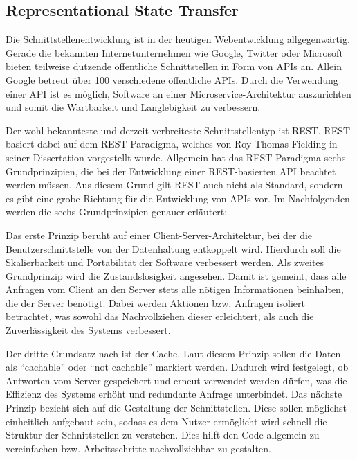 \subsection{Representational State Transfer}

Die Schnittstellenentwicklung ist in der heutigen Webentwicklung allgegenwärtig.
Gerade die bekannten Internetunternehmen wie Google\autocite{MS-GoogleLLC.2020}, Twitter\autocite{MS-TwitterInc..01.03.2020} oder Microsoft\autocite{MS-MicrosoftCorporation.21.05.2018} bieten teilweise dutzende öffentliche Schnittstellen in Form von \acp{API} an.
Allein Google betreut über 100 verschiedene öffentliche \acp{API}\autocite{rf-google-api-alle}.
Durch die Verwendung einer \ac{API} ist es möglich, Software an einer Microservice-Architektur auszurichten und somit die Wartbarkeit und Langlebigkeit zu verbessern.\autocite{rf-fowler2015microservices}

Der wohl bekannteste und derzeit verbreiteste Schnittstellentyp ist \ac{REST}.
\ac{REST} basiert dabei auf dem \ac{REST}-Paradigma, welches von Roy Thomas Fielding in seiner Dissertation\autocite{MS-Fielding.} vorgestellt wurde. Allgemein hat das \ac{REST}-Paradigma sechs Grundprinzipien, die bei der Entwicklung einer \ac{REST}-basierten \ac{API} beachtet werden müssen. 
Aus diesem Grund gilt \ac{REST} auch nicht als Standard, sondern es gibt eine grobe Richtung für die Entwicklung von \acp{API} vor.
Im Nachfolgenden werden die sechs Grundprinzipien genauer erläutert:

Das erste Prinzip beruht auf einer Client-Server-Architektur, bei der die Benutzerschnittstelle von der Datenhaltung entkoppelt wird. %
Hierdurch soll die Skalierbarkeit und Portabilität der Software verbessert werden.
Als zweites Grundprinzip wird die Zustandslosigkeit angesehen.
Damit ist gemeint, dass alle Anfragen vom Client an den Server stets alle nötigen Informationen beinhalten, die der Server benötigt.
Dabei werden Aktionen bzw. Anfragen isoliert betrachtet, was sowohl das Nachvollziehen dieser erleichtert, als auch die Zuverlässigkeit des Systems verbessert.

Der dritte Grundsatz nach \citeauthor{MS-Fielding.} ist der Cache. 
Laut diesem Prinzip sollen die Daten als \enquote{cachable} oder \enquote{not cachable} markiert werden.
Dadurch wird festgelegt, ob Antworten vom Server gespeichert und erneut verwendet werden dürfen, was die Effizienz des Systems erhöht und redundante Anfrage unterbindet.
Das nächste Prinzip bezieht sich auf die Gestaltung der Schnittstellen. 
Diese sollen möglichst einheitlich aufgebaut sein, sodass es dem Nutzer ermöglicht wird schnell die Struktur der Schnittstellen zu verstehen. 
Dies hilft den Code allgemein zu vereinfachen bzw. Arbeitsschritte nachvollziehbar zu gestalten.

